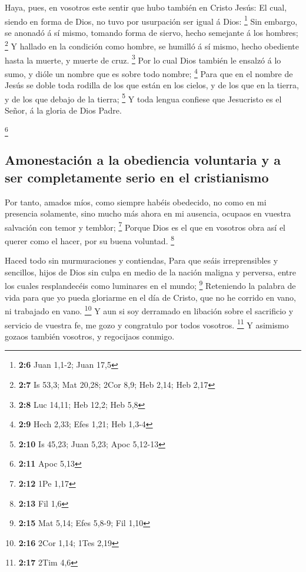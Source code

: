  Haya, pues, en vosotros este sentir que hubo también en
Cristo Jesús:  El cual, siendo en forma de Dios, no tuvo por
usurpación ser igual á Dios: \footnote{\textbf{2:6} Juan 1,1-2; Juan
  17,5}  Sin embargo, se anonadó á sí mismo, tomando forma
de siervo, hecho semejante á los hombres; \footnote{\textbf{2:7} Is
  53,3; Mat 20,28; 2Cor 8,9; Heb 2,14; Heb 2,17}  Y hallado
en la condición como hombre, se humilló á sí mismo, hecho obediente
hasta la muerte, y muerte de cruz. \footnote{\textbf{2:8} Luc 14,11; Heb
  12,2; Heb 5,8}  Por lo cual Dios también le ensalzó á lo
sumo, y dióle un nombre que es sobre todo nombre; \footnote{\textbf{2:9}
  Hech 2,33; Efes 1,21; Heb 1,3-4}  Para que en el nombre
de Jesús se doble toda rodilla de los que están en los cielos, y de los
que en la tierra, y de los que debajo de la tierra; \footnote{\textbf{2:10}
  Is 45,23; Juan 5,23; Apoc 5,12-13}  Y toda lengua
confiese que Jesucristo es el Señor, á la gloria de Dios Padre.

\footnote{\textbf{2:11} Apoc 5,13}

\hypertarget{amonestaciuxf3n-a-la-obediencia-voluntaria-y-a-ser-completamente-serio-en-el-cristianismo}{%
\subsection{Amonestación a la obediencia voluntaria y a ser
completamente serio en el
cristianismo}\label{amonestaciuxf3n-a-la-obediencia-voluntaria-y-a-ser-completamente-serio-en-el-cristianismo}}

 Por tanto, amados míos, como siempre habéis obedecido, no
como en mi presencia solamente, sino mucho más ahora en mi ausencia,
ocupaos en vuestra salvación con temor y temblor; \footnote{\textbf{2:12}
  1Pe 1,17}  Porque Dios es el que en vosotros obra así el
querer como el hacer, por su buena voluntad. \footnote{\textbf{2:13} Fil
  1,6}

 Haced todo sin murmuraciones y contiendas, 
Para que seáis irreprensibles y sencillos, hijos de Dios sin culpa en
medio de la nación maligna y perversa, entre los cuales resplandecéis
como luminares en el mundo; \footnote{\textbf{2:15} Mat 5,14; Efes
  5,8-9; Fil 1,10}  Reteniendo la palabra de vida para que
yo pueda gloriarme en el día de Cristo, que no he corrido en vano, ni
trabajado en vano. \footnote{\textbf{2:16} 2Cor 1,14; 1Tes 2,19}
 Y aun si soy derramado en libación sobre el sacrificio y
servicio de vuestra fe, me gozo y congratulo por todos vosotros.
\footnote{\textbf{2:17} 2Tim 4,6}  Y asimismo gozaos
también vosotros, y regocijaos conmigo.

